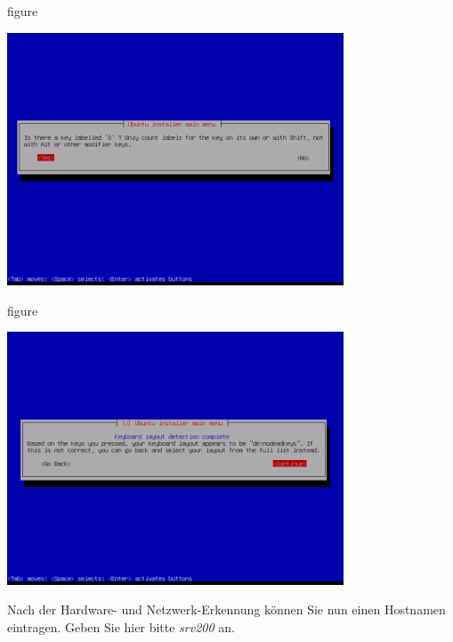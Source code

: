 \begin{nofloat}{figure}
\begin{center}
\includegraphics[width=0.75\textwidth]{screenshots/08_ubuntu_install.png}
\end{center}
\end{nofloat}

\begin{nofloat}{figure}
\begin{center}
\includegraphics[width=0.75\textwidth]{screenshots/09_ubuntu_install.png}
\end{center}
\end{nofloat}

Nach der Hardware- und Netzwerk-Erkennung können Sie nun einen Hostnamen
eintragen. Geben Sie hier bitte \textit{srv200} an.

